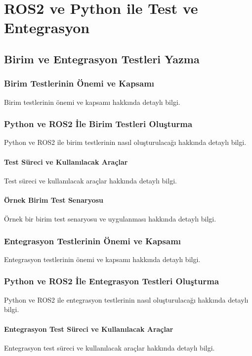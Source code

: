 \chapter{ROS2 ve Python ile Test ve Entegrasyon}

\section{Birim ve Entegrasyon Testleri Yazma}
\subsection{Birim Testlerinin Önemi ve Kapsamı}
Birim testlerinin önemi ve kapsamı hakkında detaylı bilgi.

\subsection{Python ve ROS2 İle Birim Testleri Oluşturma}
Python ve ROS2 ile birim testlerinin nasıl oluşturulacağı hakkında detaylı bilgi.

\subsubsection{Test Süreci ve Kullanılacak Araçlar}
Test süreci ve kullanılacak araçlar hakkında detaylı bilgi.

\subsubsection{Örnek Birim Test Senaryosu}
Örnek bir birim test senaryosu ve uygulanması hakkında detaylı bilgi.

\subsection{Entegrasyon Testlerinin Önemi ve Kapsamı}
Entegrasyon testlerinin önemi ve kapsamı hakkında detaylı bilgi.

\subsection{Python ve ROS2 İle Entegrasyon Testleri Oluşturma}
Python ve ROS2 ile entegrasyon testlerinin nasıl oluşturulacağı hakkında detaylı bilgi.

\subsubsection{Entegrasyon Test Süreci ve Kullanılacak Araçlar}
Entegrasyon test süreci ve kullanılacak araçlar hakkında detaylı bilgi.

